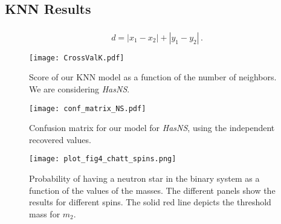 \subsection{KNN Results}


\subsubsection{}
\begin{equation}
	d = |x_1-x_2|+|y_1-y_2|\,.
\end{equation}


\begin{figure}
    \texttt{[image: CrossValK.pdf]}
    \caption{Score of our KNN model as a function of the number of neighbors. We are considering \textit{HasNS}.}
    \label{fig:crossvalK}
\end{figure}
    
\begin{figure}
    \texttt{[image: conf\_matrix\_NS.pdf]}
    \caption{Confusion matrix for our model for \textit{HasNS}, using the independent recovered values. }
    \label{fig:confmat}
\end{figure}

\begin{figure}
    \texttt{[image: plot\_fig4\_chatt\_spins.png]}
    \caption{Probability of having a neutron star in the binary system as a function of the values of the masses. The different panels show the results for different spins. The solid red line depicts the threshold mass for $m_2$.}
    \label{fig:m1m2}
\end{figure}

